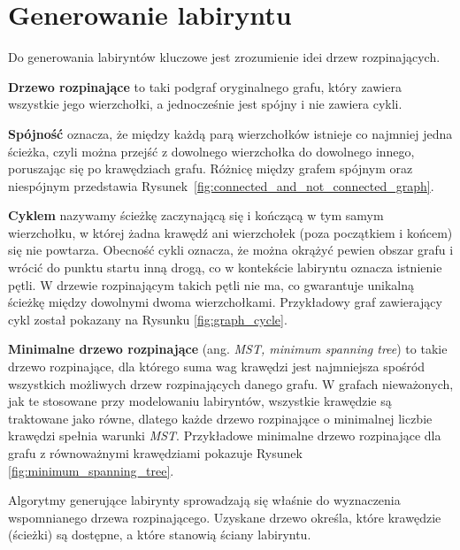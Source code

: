 \section{Generowanie labiryntu}

Do generowania labiryntów kluczowe jest zrozumienie idei drzew rozpinających.

\textbf{Drzewo rozpinające} to taki podgraf oryginalnego grafu, który zawiera wszystkie jego wierzchołki, a jednocześnie jest spójny i nie zawiera cykli. 

\textbf{Spójność} oznacza, że między każdą parą wierzchołków istnieje co najmniej jedna ścieżka, czyli można przejść z dowolnego wierzchołka do dowolnego innego, poruszając się po krawędziach grafu. Różnicę między grafem spójnym oraz niespójnym przedstawia Rysunek~\ref{fig:connected_and_not_connected_graph}.



\textbf{Cyklem} nazywamy ścieżkę zaczynającą się i kończącą w tym samym wierzchołku, w której żadna krawędź ani wierzchołek (poza początkiem i końcem) się nie powtarza. Obecność cykli oznacza, że można okrążyć pewien obszar grafu i wrócić do punktu startu inną drogą, co w kontekście labiryntu oznacza istnienie pętli. W drzewie rozpinającym takich pętli nie ma, co gwarantuje unikalną ścieżkę między dowolnymi dwoma wierzchołkami. Przykładowy graf zawierający cykl został pokazany na Rysunku \ref{fig:graph_cycle}.



\textbf{Minimalne drzewo rozpinające} (ang. \textit{MST, minimum spanning tree}) to takie drzewo rozpinające, dla którego suma wag krawędzi jest najmniejsza spośród wszystkich możliwych drzew rozpinających danego grafu. W grafach nieważonych, jak te stosowane przy modelowaniu labiryntów, wszystkie krawędzie są traktowane jako równe, dlatego każde drzewo rozpinające o minimalnej liczbie krawędzi spełnia warunki \textit{MST}. Przykładowe minimalne drzewo rozpinające dla grafu z równoważnymi krawędziami pokazuje Rysunek \ref{fig:minimum_spanning_tree}.



Algorytmy generujące labirynty sprowadzają się właśnie do wyznaczenia wspomnianego drzewa rozpinającego. 
Uzyskane drzewo określa, które krawędzie (ścieżki) są dostępne, a które stanowią ściany labiryntu.




